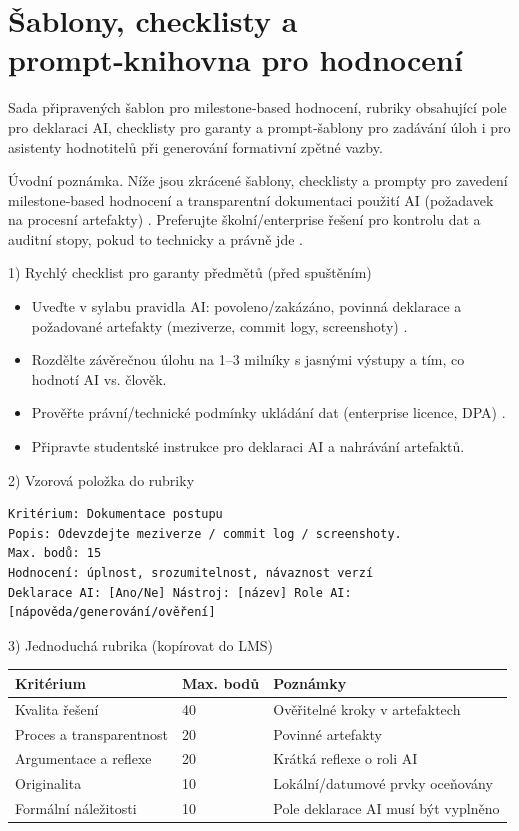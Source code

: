 \documentclass{report}%
\begin{document}
%
\section{Šablony, checklisty a prompt‑knihovna pro hodnocení}%
Sada připravených šablon pro milestone‑based hodnocení, rubriky obsahující pole pro deklaraci AI, checklisty pro garanty a prompt‑šablony pro zadávání úloh i pro asistenty hodnotitelů při generování formativní zpětné vazby.%


%
Úvodní poznámka. Níže jsou zkrácené šablony, checklisty a prompty pro zavedení milestone‑based hodnocení a transparentní dokumentaci použití AI (požadavek na procesní artefakty) \cite{kb_ai_101_tipu_pdf_04e4a115_page_8_1}. Preferujte školní/enterprise řešení pro kontrolu dat a auditní stopy, pokud to technicky a právně jde \cite{kb_ai_101_tipu_pdf_04e4a115_page_15_2}.

1) Rychlý checklist pro garanty předmětů (před spuštěním)
\begin{itemize}
  \item Uveďte v sylabu pravidla AI: povoleno/zakázáno, povinná deklarace a požadované artefakty (meziverze, commit logy, screenshoty) \cite{kb_ai_101_tipu_pdf_04e4a115_page_8_1}.
  \item Rozdělte závěrečnou úlohu na 1–3 milníky s jasnými výstupy a tím, co hodnotí AI vs. člověk.
  \item Prověřte právní/technické podmínky ukládání dat (enterprise licence, DPA) \cite{kb_ai_101_tipu_pdf_04e4a115_page_15_2}.
  \item Připravte studentské instrukce pro deklaraci AI a nahrávání artefaktů.
\end{itemize}

2) Vzorová položka do rubriky
\begin{verbatim}
Kritérium: Dokumentace postupu
Popis: Odevzdejte meziverze / commit log / screenshoty.
Max. bodů: 15
Hodnocení: úplnost, srozumitelnost, návaznost verzí
Deklarace AI: [Ano/Ne] Nástroj: [název] Role AI: [nápověda/generování/ověření]
\end{verbatim}

3) Jednoduchá rubrika (kopírovat do LMS)
\begin{center}
\begin{tabular}{p{6cm}p{1.5cm}p{6cm}}
\hline
Kritérium & Max. bodů & Poznámky \\
\hline
Kvalita řešení & 40 & Ověřitelné kroky v artefaktech \\
Proces a transparentnost & 20 & Povinné artefakty \\
Argumentace a reflexe & 20 & Krátká reflexe o roli AI \\
Originalita & 10 & Lokální/datumové prvky oceňovány \\
Formální náležitosti & 10 & Pole deklarace AI musí být vyplněno \\
\hline
\end{tabular}
\end{center}
\end{document}
